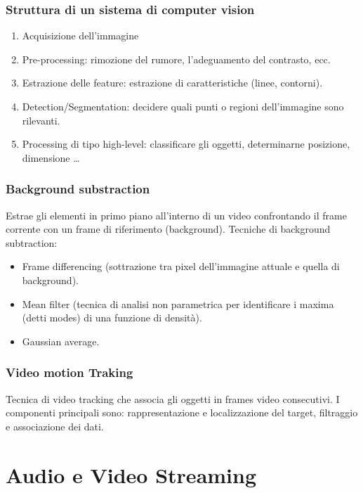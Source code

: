 \documentclass[8pt,a4paper]{article}
\begin{document}
\begin{multicols}{5}
    \subsubsection{Struttura di un sistema di computer vision}
    \begin{enumerate}
      \item Acquisizione dell’immagine
      \item Pre-processing: rimozione del rumore, l’adeguamento del contrasto, ecc.
      \item Estrazione delle feature: estrazione di caratteristiche (linee, contorni).
      \item Detection/Segmentation: decidere quali punti o regioni dell’immagine sono 
      rilevanti.
      \item Processing di tipo high-level: classificare gli oggetti, determinarne 
      posizione, dimensione …
    \end{enumerate}
    
    \subsubsection{Background substraction}
    Estrae gli elementi in primo piano all’interno di un video confrontando il frame 
    corrente con un frame di riferimento (background). Tecniche di background subtraction: 
    \begin{itemize}
      \item Frame differencing (sottrazione tra pixel dell’immagine attuale e quella di 
      background).
      \item Mean filter (tecnica di analisi non parametrica per identificare i maxima 
      (detti modes) di una funzione di densità).
      \item Gaussian average.
    \end{itemize}

    \subsubsection{Video motion Traking}
    Tecnica di video tracking che associa gli oggetti in frames video consecutivi. I 
    componenti principali sono: rappresentazione e localizzazione del target, 
    filtraggio e associazione dei dati.
    \section{Audio e Video Streaming}


\end{multicols}
\end{document}
